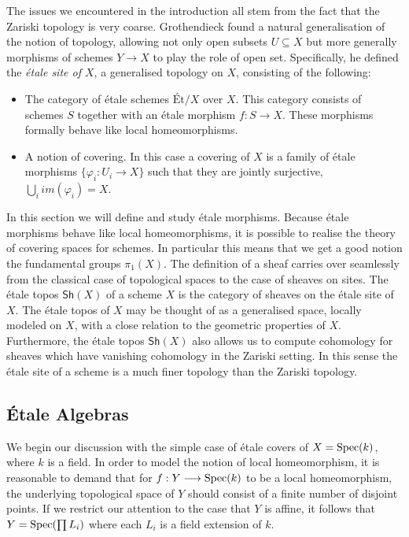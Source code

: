 The issues we encountered in the introduction all stem from the fact that the Zariski topology is very coarse. Grothendieck found a natural generalisation of the notion of topology, allowing not only open subsets $U \subseteq X$ but more generally morphisms of schemes $Y \to X$ to play the role of open set. Specifically, he defined the \textit{\'etale site of $X$}, a generalised topology on $X$, consisting of the following:

\begin{itemize}
  \item The category of \'etale schemes $\text{\'Et}/X$ over $X$. This category consists of schemes $S$ together with an \'etale morphism $f: S \to X$. These morphisms formally behave like local homeomorphisms. 
  \item A notion of covering. In this case a covering of $X$ is a family of \'etale morphisms $\{\varphi_i: U_i \to X\}$ such that they are jointly surjective, $\bigcup_i im(\varphi_i) = X$. 
\end{itemize}
In this section we will define and study \'etale morphisms.  Because \'etale morphisms behave like local homeomorphisms, it is possible to realise the theory of covering spaces for schemes. In particular this means that we get a good notion the fundamental groups $\pi_1(X)$. The definition of a sheaf carries over seamlessly from the classical case of topological spaces to the case of sheaves on sites. The \'etale topos $\mathsf{Sh}(X)$ of a scheme $X$ is the category of sheaves on the \'etale site of $X$.  The \'etale topos of $X$ may be thought of as a generalised space, locally modeled on $X$, with a close relation to the geometric properties of $X$.  Furthermore, the \'etale topos $\mathsf{Sh}(X)$ also allows us to compute cohomology for sheaves which have vanishing cohomology in the Zariski setting. In this sense the \'etale site of a scheme is a much finer topology than the Zariski topology.

\subsection{\'Etale Algebras}
We begin our discussion with the simple case of \'etale covers of $X = \operatorname{Spec}(k)$, where $k$ is a field. In order to model the notion of local homeomorphism, it is reasonable to demand that for $f: Y \longrightarrow \operatorname{Spec}(k)$ to be a local homeomorphism,  the underlying topological space of $Y$ should consist of a finite number of disjoint points. If we restrict our attention to the case that $Y$ is affine, it follows that $Y = \operatorname{Spec}(\prod L_i)$ where each $L_i$ is a field extension of $k$. 

